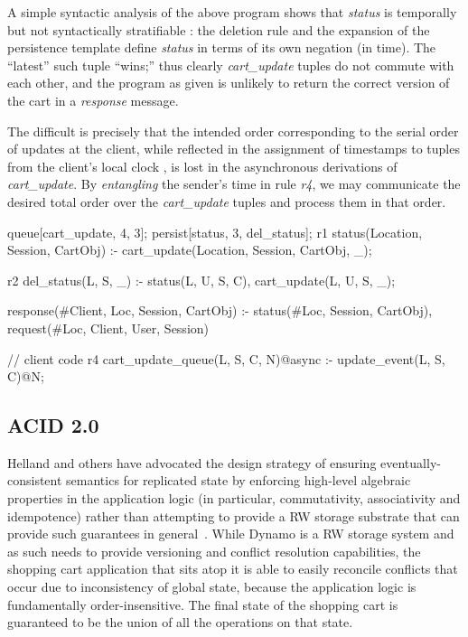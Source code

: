A simple syntactic analysis of the above program shows that {\em status} 
is temporally but not syntactically stratifiable : the deletion rule and the expansion of the
persistence template define {\em status} in terms of its own negation (in time).  The ``latest''
such tuple ``wins;'' thus clearly {\em cart\_update} tuples do not commute with each other,
and the program as given is unlikely to return the correct version of the cart in a {\em response}
message.

The difficult is precisely that the intended order corresponding to the serial order of updates
at the client, while reflected in the assignment of timestamps to tuples from the client's
local clock , is lost in the asynchronous derivations of {\em cart\_update}.  By \emph{entangling}
the sender's time in rule  {\em r4}, we may communicate the desired total order over 
the {\em cart\_update} tuples and process them in that order.  

\begin{Dedalus}
queue[cart_update, 4, 3];
persist[status, 3, del_status];
r1
status(Location, Session, CartObj) :-
    cart_update(Location,  Session, CartObj, _);
    
r2
del_status(L, S, _) :-
    status(L, U, S, C),
    cart_update(L, U, S, _);

response(#Client, Loc, Session, CartObj) :-
    status(#Loc, Session, CartObj),
    request(#Loc, Client, User, Session)

// client code
r4
cart_update_queue(L, S, C, N)@async :- 
    update_event(L, S, C)@N;

\end{Dedalus}

\subsection{ACID 2.0}

Helland and others have advocated the design strategy of ensuring eventually-consistent 
semantics for replicated state by enforcing high-level algebraic 
properties in the application logic (in particular, commutativity, associativity and 
idempotence) rather than attempting to provide a RW storage substrate that can provide
such guarantees in general~\cite{quicksand, beyond}.  While Dynamo is a RW storage system
and as such needs to provide versioning and conflict resolution capabilities, the shopping
cart application that sits atop it is able to easily reconcile conflicts that occur due to inconsistency of global state, because the application logic is fundamentally order-insensitive.
The final state of the shopping cart is guaranteed to be the union of all the operations on
that state.
